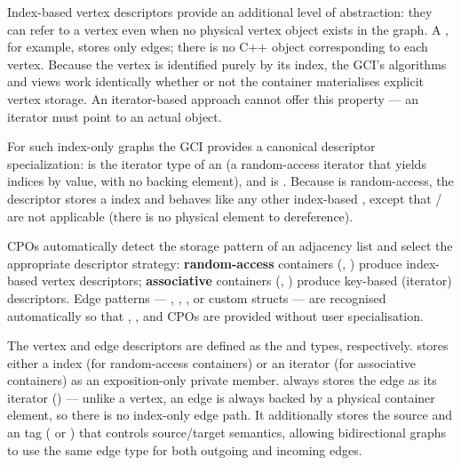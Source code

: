 Index-based vertex descriptors provide an additional level of abstraction: they can
refer to a vertex even when no physical vertex object exists in the graph.
A , for example, stores only edges; there is no C++ object
corresponding to each vertex. Because the vertex is identified purely by its index, the
GCI's algorithms and views work identically whether or not the container materialises
explicit vertex storage. An iterator-based approach cannot offer this property --- an
iterator must point to an actual object.

For such index-only graphs the GCI provides a canonical descriptor specialization:
 is the iterator type of an 
(a random-access iterator that yields indices by value, with no backing element), and
 is . Because
 is random-access, the descriptor stores a  index
and behaves like any other index-based , except that
/ are not applicable (there is no physical
element to dereference).

CPOs automatically detect the storage pattern of an adjacency list and select the
appropriate descriptor strategy: \textbf{random-access} containers (,
) produce index-based vertex descriptors; \textbf{associative} containers
(, ) produce key-based (iterator) descriptors. Edge
patterns --- , , , or custom structs
--- are recognised automatically so that , , and
 CPOs are provided without user specialisation.

The vertex and edge descriptors are defined as the  and
 types, respectively.  stores
either a  index (for random-access containers) or an iterator (for
associative containers) as an exposition-only private member.
 always stores the edge
as its iterator () --- unlike a vertex, an edge is always backed by a
physical container element, so there is no index-only edge path. It additionally stores the
source  and an  tag (
or ) that controls source/target semantics, allowing bidirectional
graphs to use the same edge type for both outgoing and incoming edges.

